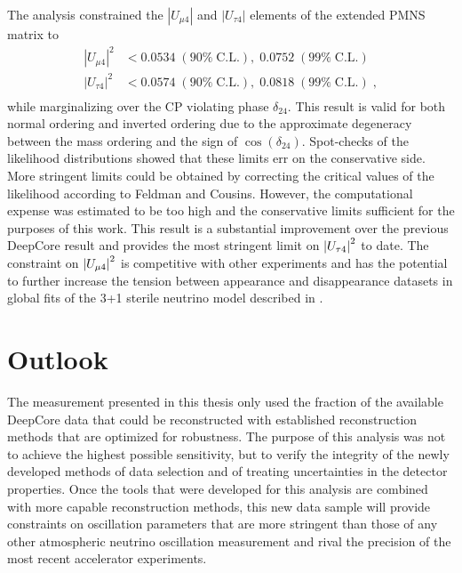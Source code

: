 The analysis constrained the $|U_{\mu4}|$ and $|U_{\tau4}|$ elements of the extended PMNS matrix to
\begin{equation}
\begin{aligned}
    |U_{\mu 4}|^2 & < 0.0534\;(90\%\;\mathrm{C.L.}),\;0.0752\;(99\%\;\mathrm{C.L.})\\
    |U_{\tau 4}|^2 & < 0.0574\;(90\%\;\mathrm{C.L.}),\;0.0818\;(99\%\;\mathrm{C.L.})\;,\\
\end{aligned}
\end{equation}
while marginalizing over the CP violating phase $\delta_{24}$. This result is valid for both normal ordering and inverted ordering due to the approximate degeneracy between the mass ordering and the sign of $\cos(\delta_{24})$. Spot-checks of the likelihood distributions showed that these limits err on the conservative side. More stringent limits could be obtained by correcting the critical values of the likelihood according to Feldman and Cousins\cite{Feldman_1998}. However, the computational expense was estimated to be too high and the conservative limits sufficient for the purposes of this work. This result is a substantial improvement over the previous DeepCore result and provides the most stringent limit on $\abs{U_{\tau4}}^2$ to date. The constraint on $\abs{U_{\mu4}}^2$ is competitive with other experiments and has the potential to further increase the tension between appearance and disappearance datasets in global fits of the 3+1 sterile neutrino model described in .

\section{Outlook}

The measurement presented in this thesis only used the fraction of the available DeepCore data that could be reconstructed with established reconstruction methods that are optimized for robustness.
The purpose of this analysis was not to achieve the highest possible sensitivity, but to verify the integrity of the newly developed methods of data selection and of treating uncertainties in the detector properties.
Once the tools that were developed for this analysis are combined with more capable reconstruction methods, this new data sample will provide constraints on oscillation parameters that are more stringent than those of any other atmospheric neutrino oscillation measurement and rival the precision of the most recent accelerator experiments.

